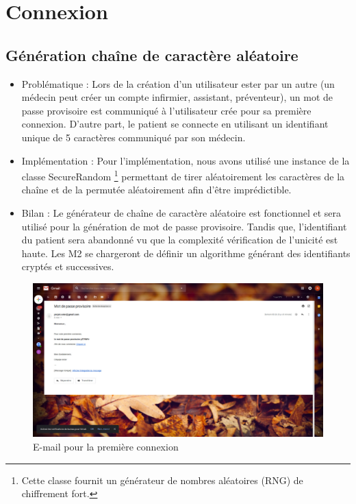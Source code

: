 \section{Connexion}

\subsection{Génération chaîne de caractère aléatoire}
    
\begin{itemize} 
\item Problématique :
Lors de la création d’un utilisateur ester par un autre (un médecin peut créer un compte infirmier, assistant, préventeur), un mot de passe provisoire est communiqué à l’utilisateur crée pour sa première connexion.
D’autre part, le patient se connecte en utilisant un identifiant unique de 5 caractères communiqué par son médecin.
\item  Implémentation :
Pour l’implémentation, nous avons utilisé une instance de la classe SecureRandom \footnote{Cette classe fournit un générateur de nombres aléatoires (RNG) de chiffrement fort.} permettant de tirer aléatoirement les caractères de la chaîne et de la  permutée aléatoirement afin d’être imprédictible.
\item  Bilan :
Le générateur de chaîne de caractère aléatoire est fonctionnel et sera utilisé pour la génération de mot de passe provisoire. Tandis que, l’identifiant du patient sera abandonné vu que la complexité vérification de l’unicité est haute. Les M2 se chargeront de définir un algorithme générant des identifiants cryptés et successives.

\end{itemize}

\begin{figure}[H]
    \begin{center}
	\includegraphics[scale=0.25]{img/connexion/mailCo}
    \end{center}
    \caption{E-mail pour la première connexion}
\end{figure}

